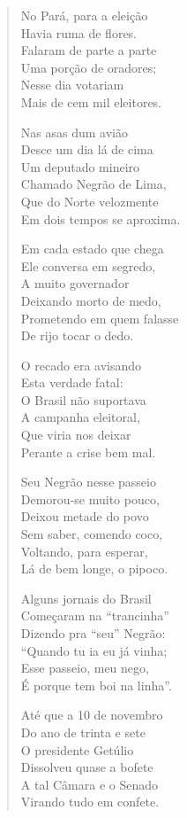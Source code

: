 \begin{verse}
No Pará, para a eleição\\
Havia ruma de flores.\\
Falaram de parte a parte\\
Uma porção de oradores;\\
Nesse dia votariam\\
Mais de cem mil eleitores.


Nas asas dum avião\\
Desce um dia lá de cima\\
Um deputado mineiro\\
Chamado Negrão de Lima,\\
Que do Norte velozmente\\
Em dois tempos se aproxima.

Em cada estado que chega\\
Ele conversa em segredo,\\
A muito governador\\
Deixando morto de medo,\\
Prometendo em quem falasse\\
De rijo tocar o dedo.

O recado era avisando\\
Esta verdade fatal:\\
O Brasil não suportava\\
A campanha eleitoral,\\
Que viria nos deixar\\
Perante a crise bem mal.

Seu Negrão nesse passeio\\
Demorou-se muito pouco,\\
Deixou metade do povo\\
Sem saber, comendo coco,\\
Voltando, para esperar,\\
Lá de bem longe, o pipoco.


Alguns jornais do Brasil\\
Começaram na “trancinha”\\
Dizendo pra “seu” Negrão:\\
“Quando tu ia eu já vinha;\\
Esse passeio, meu nego,\\
É porque tem boi na linha”.

Até que a 10 de novembro\\
Do ano de trinta e sete\\
O presidente Getúlio\\
Dissolveu quase a bofete\\
A tal Câmara e o Senado\\
Virando tudo em confete.


\end{verse}
